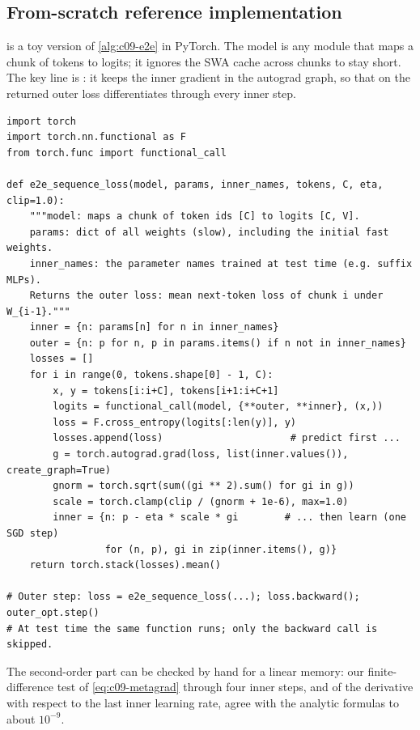 \subsection{From-scratch reference implementation}

 is a toy version of \cref{alg:c09-e2e} in PyTorch. The model is any module
that maps a chunk of tokens to logits; it ignores the SWA cache across chunks to stay short.
The key line is : it keeps the inner gradient in the autograd graph, so
that  on the returned outer loss differentiates through every inner step.

\begin{lstlisting}[caption={Reference implementation (ours): a toy TTT-E2E inner loop with a differentiable outer loss.},label={lst:c09-e2e}]
import torch
import torch.nn.functional as F
from torch.func import functional_call

def e2e_sequence_loss(model, params, inner_names, tokens, C, eta, clip=1.0):
    """model: maps a chunk of token ids [C] to logits [C, V].
    params: dict of all weights (slow), including the initial fast weights.
    inner_names: the parameter names trained at test time (e.g. suffix MLPs).
    Returns the outer loss: mean next-token loss of chunk i under W_{i-1}."""
    inner = {n: params[n] for n in inner_names}
    outer = {n: p for n, p in params.items() if n not in inner_names}
    losses = []
    for i in range(0, tokens.shape[0] - 1, C):
        x, y = tokens[i:i+C], tokens[i+1:i+C+1]
        logits = functional_call(model, {**outer, **inner}, (x,))
        loss = F.cross_entropy(logits[:len(y)], y)
        losses.append(loss)                      # predict first ...
        g = torch.autograd.grad(loss, list(inner.values()), create_graph=True)
        gnorm = torch.sqrt(sum((gi ** 2).sum() for gi in g))
        scale = torch.clamp(clip / (gnorm + 1e-6), max=1.0)
        inner = {n: p - eta * scale * gi        # ... then learn (one SGD step)
                 for (n, p), gi in zip(inner.items(), g)}
    return torch.stack(losses).mean()

# Outer step: loss = e2e_sequence_loss(...); loss.backward(); outer_opt.step()
# At test time the same function runs; only the backward call is skipped.
\end{lstlisting}

The second-order part can be checked by hand for a linear memory: our finite-difference test
of \eqref{eq:c09-metagrad} through four inner steps, and of the derivative with respect to the
last inner learning rate, agree with the analytic formulas to about $10^{-9}$.

